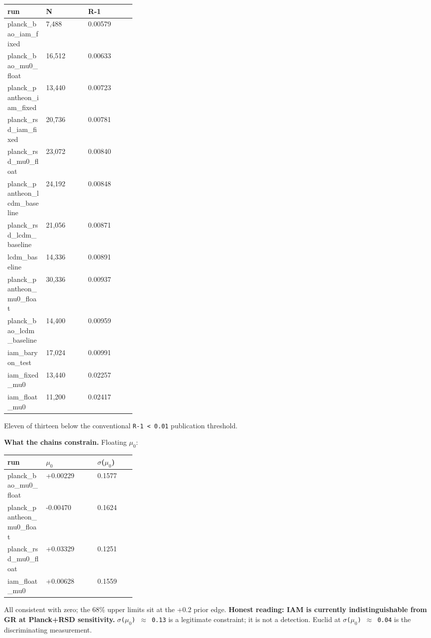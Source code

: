 \documentclass[12pt,a4paper]{article}
\begin{document}
\begin{small}
\begin{tabularx}{\linewidth}{L{0.30\linewidth}YY}
\toprule
\textbf{run} & \textbf{N} & \textbf{R-1} \\
\midrule
planck\_bao\_iam\_fixed & 7,488 & 0.00579 \\
planck\_bao\_mu0\_float & 16,512 & 0.00633 \\
planck\_pantheon\_iam\_fixed & 13,440 & 0.00723 \\
planck\_rsd\_iam\_fixed & 20,736 & 0.00781 \\
planck\_rsd\_mu0\_float & 23,072 & 0.00840 \\
planck\_pantheon\_lcdm\_baseline & 24,192 & 0.00848 \\
planck\_rsd\_lcdm\_baseline & 21,056 & 0.00871 \\
lcdm\_baseline & 14,336 & 0.00891 \\
planck\_pantheon\_mu0\_float & 30,336 & 0.00937 \\
planck\_bao\_lcdm\_baseline & 14,400 & 0.00959 \\
iam\_baryon\_test & 17,024 & 0.00991 \\
iam\_fixed\_mu0 & 13,440 & 0.02257 \\
iam\_float\_mu0 & 11,200 & 0.02417 \\
\bottomrule
\end{tabularx}
\end{small}


Eleven of thirteen below the conventional \texttt{R-1 < 0.01} publication threshold.


\textbf{What the chains constrain.} Floating $\mu_{0}$:


\begin{small}
\begin{tabularx}{\linewidth}{L{0.30\linewidth}YY}
\toprule
\textbf{run} & \textbf{$\mu_{0}$} & \textbf{$\sigma$($\mu_{0}$)} \\
\midrule
planck\_bao\_mu0\_float & +0.00229 & 0.1577 \\
planck\_pantheon\_mu0\_float & -0.00470 & 0.1624 \\
planck\_rsd\_mu0\_float & +0.03329 & 0.1251 \\
iam\_float\_mu0 & +0.00628 & 0.1559 \\
\bottomrule
\end{tabularx}
\end{small}


All consistent with zero; the 68\% upper limits sit at the +0.2 prior edge. \textbf{Honest reading: IAM is currently indistinguishable from GR at Planck+RSD sensitivity.} \texttt{$\sigma$($\mu_{0}$) $\approx$ 0.13} is a legitimate constraint; it is not a detection. Euclid at \texttt{$\sigma$($\mu_{0}$) $\approx$ 0.04} is the discriminating measurement.
\end{document}
